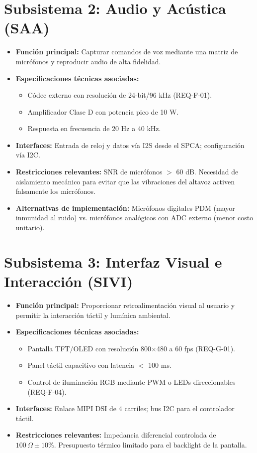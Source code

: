 \documentclass[%
	paper=a4,
	twoside=false,
	parskip=half,
	chapterprefix=false,
	10pt,
	headings=normal,
	bibliography=totoc,
	listof=totoc,
	titlepage=on,
	captions=tableabove,
	draft=false,
]{scrbook}%
\begin{document}
\section{Subsistema 2: Audio y Acústica (SAA)}
\begin{itemize}
    \item \textbf{Función principal:} Capturar comandos de voz mediante una matriz de micrófonos y reproducir audio de alta fidelidad.
    \item \textbf{Especificaciones técnicas asociadas:}
        \begin{itemize}
            \item Códec externo con resolución de 24-bit/96 kHz (REQ-F-01).
            \item Amplificador Clase D con potencia pico de 10 W.
            \item Respuesta en frecuencia de 20 Hz a 40 kHz.
        \end{itemize}
    \item \textbf{Interfaces:} Entrada de reloj y datos vía I2S desde el SPCA; configuración vía I2C.
    \item \textbf{Restricciones relevantes:} SNR de micrófonos $>$ 60 dB. Necesidad de aislamiento mecánico para evitar que las vibraciones del altavoz activen falsamente los micrófonos.
    \item \textbf{Alternativas de implementación:} Micrófonos digitales PDM (mayor inmunidad al ruido) vs. micrófonos analógicos con ADC externo (menor costo unitario).
\end{itemize}

\section{Subsistema 3: Interfaz Visual e Interacción (SIVI)}
\begin{itemize}
    \item \textbf{Función principal:} Proporcionar retroalimentación visual al usuario y permitir la interacción táctil y lumínica ambiental.
    \item \textbf{Especificaciones técnicas asociadas:}
        \begin{itemize}
            \item Pantalla TFT/OLED con resolución 800$\times$480 a 60 fps (REQ-G-01).
            \item Panel táctil capacitivo con latencia $<$ 100 ms.
            \item Control de iluminación RGB mediante PWM o LEDs direccionables (REQ-F-04).
        \end{itemize}
    \item \textbf{Interfaces:} Enlace MIPI DSI de 4 carriles; bus I2C para el controlador táctil.
    \item \textbf{Restricciones relevantes:} Impedancia diferencial controlada de $100\,\Omega \pm 10\%$. Presupuesto térmico limitado para el backlight de la pantalla.
\end{itemize}
\end{document}
